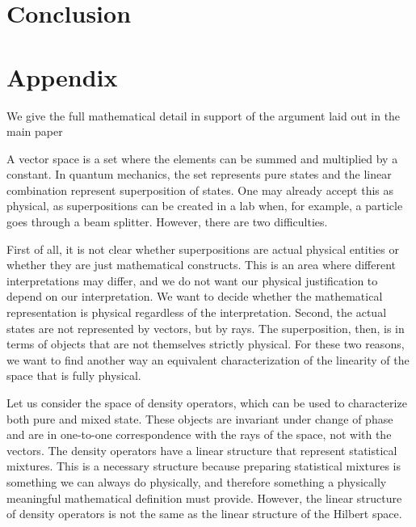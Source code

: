 \documentclass[10pt,twocolumn, nofootinbib]{revtex4-2}
\begin{document}
\section{Conclusion}





\newcommand{\pj}[1] {\underbar{$#1$}}

\section*{Appendix}

We give the full mathematical detail in support of the argument laid out in the main paper




A vector space is a set where the elements can be summed and multiplied by a constant. In quantum mechanics, the set represents pure states and the linear combination represent superposition of states. One may already accept this as physical, as superpositions can be created in a lab when, for example, a particle goes through a beam splitter. However, there are two difficulties.

First of all, it is not clear whether superpositions are actual physical entities or whether they are just mathematical constructs. This is an area where different interpretations may differ, and we do not want our physical justification to depend on our interpretation. We want to decide whether the mathematical representation is physical regardless of the interpretation. Second, the actual states are not represented by vectors, but by rays. The superposition, then, is in terms of objects that are not themselves strictly physical. For these two reasons, we want to find another way an equivalent characterization of the linearity of the space that is fully physical.

Let us consider the space of density operators, which can be used to characterize both pure and mixed state. These objects are invariant under change of phase and are in one-to-one correspondence with the rays of the space, not with the vectors. The density operators have a linear structure that represent statistical mixtures. This is a necessary structure because preparing statistical mixtures is something we can always do physically, and therefore something a physically meaningful mathematical definition must provide. However, the linear structure of density operators is not the same as the linear structure of the Hilbert space.
\end{document}
